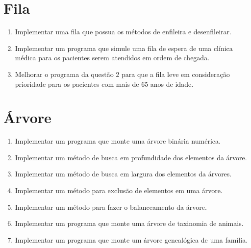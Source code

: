 \documentclass[11pt]{article}
\begin{document}
\newpage
\section{Fila}

\begin{enumerate}
	
	\item Implementar uma fila que possua os métodos de enfileira e desenfileirar.
	
	\item Implementar um programa que  simule uma fila de espera de uma clínica médica para os pacientes serem atendidos em ordem de chegada.
	
	\item Melhorar o programa da questão 2 para que a fila leve em consideração prioridade para os pacientes com mais de 65 anos de idade.
\end{enumerate}

\newpage
\section{Árvore}

\begin{enumerate}
	
	\item Implementar um programa que monte uma árvore binária numérica.
	
	\item Implementar um método de busca em profundidade dos elementos da árvore.
	
	\item Implementar um método de busca em largura dos elementos da árvores.
	
	\item Implementar um método para exclusão de elementos em uma árvore. 
	
	\item Implementar um método para fazer o balanceamento da árvore.
	
	\item Implementar um programa que monte uma árvore de taxinomia de animais.
	
	\item Implementar um programa que monte um árvore genealógica de uma família.
	
\end{enumerate}
\end{document}
